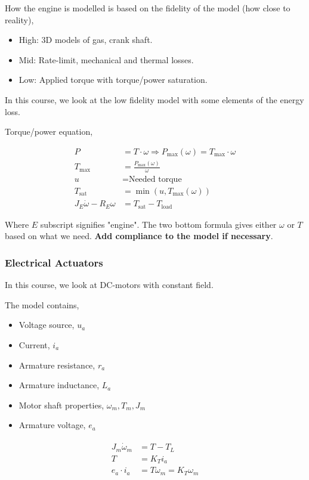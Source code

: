 How the engine is modelled is based on the fidelity of the model (how close to reality),

\begin{itemize}
    \item High: 3D models of gas, crank shaft.
    \item Mid: Rate-limit, mechanical and thermal losses.
    \item Low: Applied torque with torque/power saturation.
\end{itemize}

In this course, we look at the low fidelity model with some elements of the energy loss.

Torque/power equation,

$$
\begin{aligned}
    P &= T \cdot \omega \Rightarrow P_{\text{max}}(\omega) = T_{\max} \cdot \omega
    \\
    T_{\max} &= \frac{P_{\max}(\omega)}{\omega}
    \\
    u &= \text{Needed torque}
    \\
    T_\text{sat} &= \min(u,T_{\max}(\omega))
    \\
    J_E\dot{\omega} - R_E\omega &= T_{\text{sat}} - T_{\text{load}}
\end{aligned}
$$

Where $E$ subscript signifies "engine". The two bottom formula gives either $\omega$ or $T$ based on what we need. \textbf{Add compliance to the model if necessary}.

\subsubsection{Electrical Actuators}

In this course, we look at DC-motors with constant field.

The model contains,

\begin{itemize}
    \item Voltage source, $u_a$
    \item Current, $i_a$
    \item Armature resistance, $r_a$
    \item Armature inductance, $L_a$
    \item Motor shaft properties, $\omega_m, T_m, J_m$
    \item Armature voltage, $e_a$
\end{itemize}

\begin{align}
    \begin{split}
        J_m \Dot{\omega}_m &= T - T_L
        \\
        T &= K_T i_a
        \\
        e_a \cdot i_a &= T \omega_m = K_T \omega_m
    \end{split}
\end{align}

